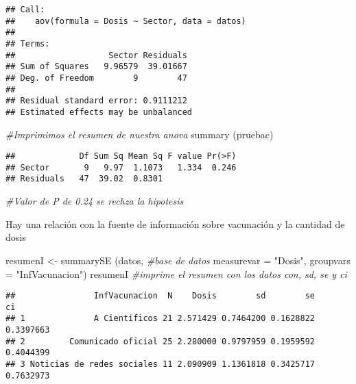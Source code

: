 \documentclass[
]{article}
\newenvironment{Shaded}{\begin{snugshade}}{\end{snugshade}}
\newcommand{\AttributeTok}[1]{\textcolor[rgb]{0.77,0.63,0.00}{#1}}
\newcommand{\CommentTok}[1]{\textcolor[rgb]{0.56,0.35,0.01}{\textit{#1}}}
\newcommand{\FunctionTok}[1]{\textcolor[rgb]{0.00,0.00,0.00}{#1}}
\newcommand{\NormalTok}[1]{#1}
\newcommand{\OtherTok}[1]{\textcolor[rgb]{0.56,0.35,0.01}{#1}}
\newcommand{\StringTok}[1]{\textcolor[rgb]{0.31,0.60,0.02}{#1}}
\begin{document}
\begin{verbatim}
## Call:
##    aov(formula = Dosis ~ Sector, data = datos)
## 
## Terms:
##                   Sector Residuals
## Sum of Squares   9.96579  39.01667
## Deg. of Freedom        9        47
## 
## Residual standard error: 0.9111212
## Estimated effects may be unbalanced
\end{verbatim}

\begin{Shaded}
\begin{Highlighting}[]
\CommentTok{\#Imprimimos el resumen de nuestra anova}
\FunctionTok{summary}\NormalTok{ (pruebac)}
\end{Highlighting}
\end{Shaded}

\begin{verbatim}
##             Df Sum Sq Mean Sq F value Pr(>F)
## Sector       9   9.97  1.1073   1.334  0.246
## Residuals   47  39.02  0.8301
\end{verbatim}

\begin{Shaded}
\begin{Highlighting}[]
\CommentTok{\#Valor de P de 0.24 se rechza la hipotesis}
\end{Highlighting}
\end{Shaded}

Hay una relación con la fuente de información sobre vacunación y la
cantidad de dosis

\begin{Shaded}
\begin{Highlighting}[]
\NormalTok{resumenI }\OtherTok{\textless{}{-}} \FunctionTok{summarySE}\NormalTok{ (datos, }\CommentTok{\#base de datos}
                      \AttributeTok{measurevar =} \StringTok{"Dosis"}\NormalTok{, }
                      \AttributeTok{groupvars =} \StringTok{"InfVacunacion"}\NormalTok{) }
\NormalTok{resumenI }\CommentTok{\#imprime el resumen con los datos con, sd, se y ci}
\end{Highlighting}
\end{Shaded}

\begin{verbatim}
##                InfVacunacion  N    Dosis        sd        se        ci
## 1              A Cientificos 21 2.571429 0.7464200 0.1628822 0.3397663
## 2         Comunicado oficial 25 2.280000 0.9797959 0.1959592 0.4044399
## 3 Noticias de redes sociales 11 2.090909 1.1361818 0.3425717 0.7632973
\end{verbatim}
\end{document}
